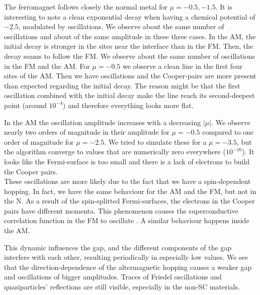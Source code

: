 \documentclass[..\main.tex]{subfile}
\begin{document}
The ferromagnet follows closely the normal metal for $\mu=-0.5,-1.5$. It is interesting to note a clean exponential
decay when having a chemical potential of $-2.5$, modulated by oscillations. We observe about the same number of oscillations and about of
the same amplitude in these three cases. In the AM, the initial decay is stronger in the sites near the 
interface than in the FM. Then, the decay seams to follow the FM. We observe about the same number of oscillations in the FM and the AM.
For $\mu=-0.5$ we observe a clean line in the first four sites of the AM. Then we have oscillations and the Cooper-pairs are more present
than expected regarding the initial decay. The reason might be that the first oscillation combined with the initial decay make the line
reach its second-deepest point (around $10^{-4}$) and therefore everything looks more flat.

In the AM the oscillation amplitude increases with a decreasing $|\mu|$.
We observe nearly two orders of magnitude in their amplitude for $\mu=-0.5$ compared to one order of magnitude for $\mu=-2.5$.
We tried to simulate these for a $\mu=-3.5$, but the algorithm  converge to values that are numerically zero everywhere ($10^{-16}$).
It looks like the Fermi-surface is too small and there is a lack of electrons to build the Cooper pairs.\\
 
These oscillations are more likely due to the fact that we have a spin-dependent hopping. In fact, we have the same behaviour for the AM
and the FM, but not in the N. As a result of the spin-splitted Fermi-surfaces, the electrons in the Cooper pairs have different momenta.
This phenomenon causes the superconductive correlation function in the FM to oscillate \cite{Jong1995}. A similar behaviour happens inside the AM.

This dynamic influences the gap, and the different components of the gap interfere with each other, resulting
periodically in especially low values. We see that the direction-dependence of the altermagnetic hopping causes a weaker gap and 
oscillations of bigger amplitudes. Traces of Friedel oscillations and quasiparticles' reflections are still visible, especially in the non-SC materials.\\
\end{document}

